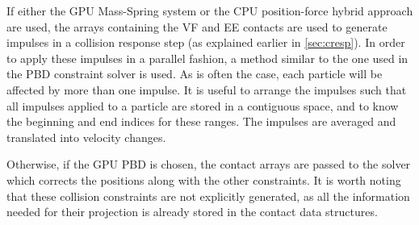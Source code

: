 If either the GPU Mass-Spring system or the CPU position-force hybrid approach are used, the arrays containing the VF and EE contacts are used to generate impulses in a collision response step (as explained earlier in \autoref{sec:cresp}). In order to apply these impulses in a parallel fashion, a method similar to the one used in the PBD constraint solver is used. As is often the case, each particle will be affected by more than one impulse. It is useful to arrange the impulses such that all impulses applied to a particle are stored in a contiguous space, and to know the beginning and end indices for these ranges. The impulses are averaged and translated into velocity changes.

Otherwise, if the GPU PBD is chosen, the contact arrays are passed to the solver which corrects the positions along with the other constraints. It is worth noting that these collision constraints are not explicitly generated, as all the information needed for their projection is already stored in the contact data structures.



